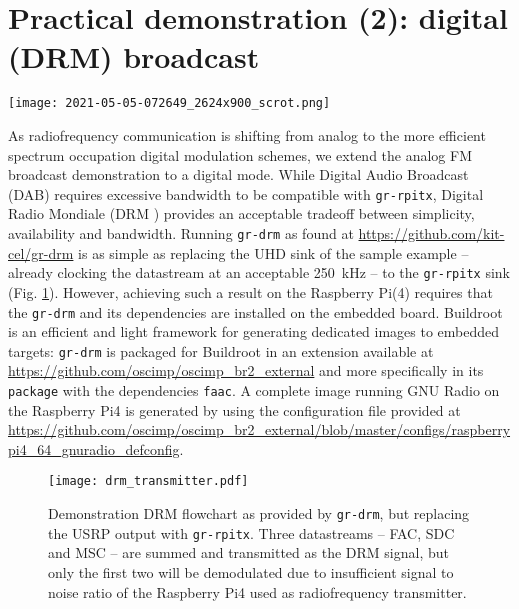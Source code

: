 \documentclass{article}
\begin{document}
\section{Practical demonstration (2): digital (DRM) broadcast}

\begin{figure*}
\texttt{[image: 2021-05-05-072649\_2624x900\_scrot.png]}
\caption{DRM (Digital Radio Mondiale) emission from {\tt gr-rpitx} fed
by {\tt gr-drm} and reception using DREAM running on the host PC. Notice how
a Pulse Audio virtual sink is used to feed DREAM with the output of GNU Radio.
Right is the spectrum (magnitude) and raw constellation observed with GNU Radio,
center-bottom is the constellation provided by DREAM, bottom left demonstrates
how the encoding and station identified are decoded, top left is the host PC
reception scheme and top left is the Pulse Audio virtual sink while top-middle is
the Raspberry Pi 4 terminal emitting DRM using {\tt gr-rpitx}. The signal to noise
ratio is below 5~dB, preventing the constellation from locking on the audio signal.}
\label{drm}
\end{figure*}

As radiofrequency communication is shifting from analog to the more
efficient spectrum occupation digital modulation schemes, we extend
the analog FM broadcast demonstration to a digital mode. While Digital
Audio Broadcast (DAB) requires excessive bandwidth to be compatible
with {\tt gr-rpitx}, Digital Radio Mondiale (DRM \cite{drm}) provides an acceptable
tradeoff between simplicity, availability and bandwidth. Running {\tt gr-drm}
as found at \url{https://github.com/kit-cel/gr-drm} is as simple as replacing
the UHD sink of the sample example -- already clocking the datastream at
an acceptable 250~kHz -- to the {\tt gr-rpitx} sink (Fig. \ref{drmtx}). However,
achieving such a result on the Raspberry Pi(4) requires that the {\tt gr-drm}
and its dependencies are installed on the embedded board. Buildroot is an efficient
and light framework for generating dedicated images to embedded targets: {\tt gr-drm}
is packaged for Buildroot in an extension available at \url{https://github.com/oscimp/oscimp_br2_external}
and more specifically in its {\tt package} with the dependencies {\tt faac}.
A complete image running GNU Radio on the Raspberry Pi4 is generated by using the
configuration file provided at \url{https://github.com/oscimp/oscimp_br2_external/blob/master/configs/raspberrypi4_64_gnuradio_defconfig}.

\begin{figure}[h!tb]
\texttt{[image: drm\_transmitter.pdf]}
\caption{Demonstration DRM flowchart as provided by {\tt gr-drm}, but replacing 
the USRP output with {\tt gr-rpitx}. Three datastreams -- FAC, SDC and MSC -- are 
summed and transmitted as the DRM signal, but only the first two will be demodulated
due to insufficient signal to noise ratio of the Raspberry Pi4 used as radiofrequency
transmitter.}
\label{drmtx}
\end{figure}
\end{document}

